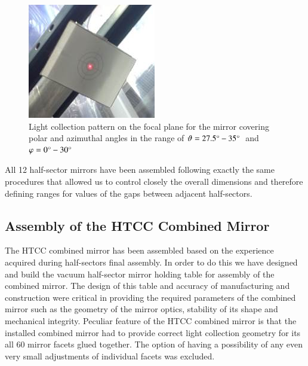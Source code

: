 \begin{figure}[h]
    \centering
    \includegraphics[width=0.95\linewidth]{images/Focal_Plane_1R.jpg}
    \caption{Light collection pattern on the focal plane for the mirror covering polar and azimuthal angles in the range of $\vartheta = 27.5\degree - 35\degree$\, and\, $\varphi = 0\degree - 30\degree$}
    \label{fig:Focal_Plane_1R}
\end{figure}

\indent All 12 half-sector mirrors have been assembled following exactly the same procedures that allowed us to control closely the overall dimensions and therefore defining ranges for values of the gaps between adjacent half-sectors. 

\subsection{Assembly of the HTCC Combined Mirror}

 The HTCC combined mirror has been assembled based on the experience acquired during half-sectors final assembly. In order to do this we have designed and build the vacuum half-sector mirror holding table for assembly of the combined mirror. The design of this table and accuracy of manufacturing and construction were critical in providing the required parameters of the combined mirror such as the geometry of the mirror optics, stability of its shape and mechanical integrity. Peculiar feature of the HTCC combined mirror is that the installed combined mirror had to provide correct light collection geometry for its all 60 mirror facets glued together. The option of having a possibility of any even very small adjustments of individual facets was excluded.
 
